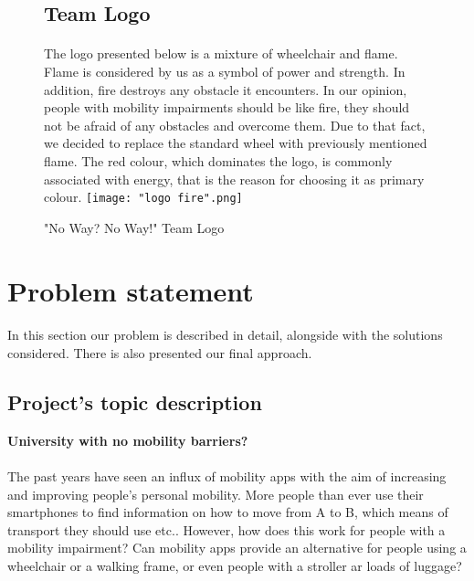 \documentclass[12pt]{article}
\begin{document}
\newpage

\begin{figure}[H]
\subsection{Team Logo}
\paragraph{}The logo presented below is a mixture of wheelchair and flame. Flame is considered by us as a symbol of power and strength. In addition, fire destroys any obstacle it encounters. In our opinion, people with mobility impairments should be like fire, they should not be afraid of any obstacles and overcome them. Due to that fact, we decided to replace the standard wheel with previously mentioned flame. The red colour, which dominates the logo, is commonly associated with energy, that is the reason for choosing it as primary colour.
\texttt{[image: "logo fire".png]}
\caption{"No Way? No Way!" Team Logo}
\label{fig:logo}
\end{figure}

\section{Problem statement}
\paragraph{}
In this section our problem is described in detail, alongside with the solutions considered. There is also presented our final approach.
\subsection{Project's topic description}
\textbf{University with no mobility barriers?}
\paragraph{}The past years have seen an influx of mobility apps with the aim of increasing and improving people's personal mobility. More people than ever use their smartphones to find information on how to move from A to B, which means of transport they should use etc.. However, how does this work for people with a mobility impairment? Can mobility apps provide an alternative for people using a wheelchair or a walking frame, or even people with a stroller ar loads of luggage?
\end{document}
